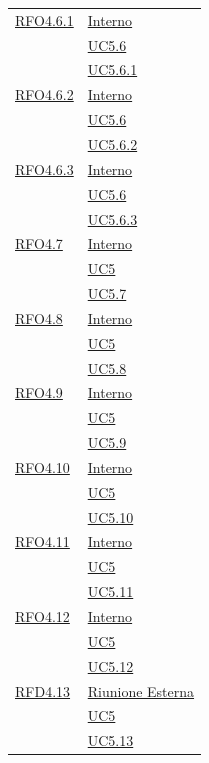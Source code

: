 \begin{itemize}
\begin{itemize}
\begin{itemize}
\begin{itemize}
\begin{longtable}{|>{\centering}m{5cm}|m{5cm}<{\centering}|}
\hyperlink{RFO4.6.1}{RFO4.6.1} & \hyperlink{Interno}{Interno}\\
& \hyperref[UC5.6]{UC5.6}\\
& \hyperref[UC5.6.1]{UC5.6.1}\\ \hline

\hyperlink{RFO4.6.2}{RFO4.6.2} & \hyperlink{Interno}{Interno}\\
& \hyperref[UC5.6]{UC5.6}\\
& \hyperref[UC5.6.2]{UC5.6.2}\\ \hline

\hyperlink{RFO4.6.3}{RFO4.6.3} & \hyperlink{Interno}{Interno}\\
& \hyperref[UC5.6]{UC5.6}\\
& \hyperref[UC5.6.3]{UC5.6.3}\\ \hline

\hyperlink{RFO4.7}{RFO4.7} & \hyperlink{Interno}{Interno}\\
& \hyperref[UC5]{UC5}\\
& \hyperref[UC5.7]{UC5.7}\\ \hline

\hyperlink{RFO4.8}{RFO4.8} & \hyperlink{Interno}{Interno}\\
& \hyperref[UC5]{UC5}\\
& \hyperref[UC5.8]{UC5.8}\\ \hline

\hyperlink{RFO4.9}{RFO4.9} & \hyperlink{Interno}{Interno}\\
& \hyperref[UC5]{UC5}\\
& \hyperref[UC5.9]{UC5.9}\\ \hline

\hyperlink{RFO4.10}{RFO4.10} & \hyperlink{Interno}{Interno}\\
& \hyperref[UC5]{UC5}\\
& \hyperref[UC5.10]{UC5.10}\\ \hline

\hyperlink{RFO4.11}{RFO4.11} & \hyperlink{Interno}{Interno}\\
& \hyperref[UC5]{UC5}\\
& \hyperref[UC5.11]{UC5.11}\\ \hline

\hyperlink{RFO4.12}{RFO4.12} & \hyperlink{Interno}{Interno}\\
& \hyperref[UC5]{UC5}\\
& \hyperref[UC5.12]{UC5.12}\\ \hline

\hyperlink{RFD4.13}{RFD4.13} & \hyperlink{Riunione Esterna}{Riunione Esterna}\\
& \hyperref[UC5]{UC5}\\
& \hyperref[UC5.13]{UC5.13}\\ \hline


\end{longtable}
\end{itemize}
\end{itemize}
\end{itemize}
\end{itemize}
